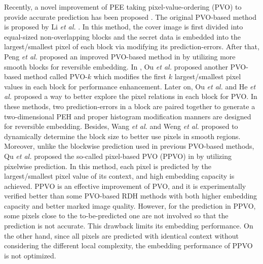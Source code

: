 \documentclass[review,3p,10pt,sort&compress]{elsarticle}
\begin{document}
Recently, a novel improvement of PEE taking pixel-value-ordering (PVO) to provide accurate prediction has been proposed \cite{
Li2013PVO,
Peng2014IPVO,
Ou2014PVOk,
Qu2015PPVO,
Xiang2015A,
Bo2016Improved,
Weng2016Reversible,
Weng2017Optimal,
He2018Reversible,
Kim2018Skewed}.
The original PVO-based method is proposed by Li \emph{et al.} \cite{Li2013PVO}. In this method, the cover image is first divided into equal-sized non-overlapping blocks and the secret data is embedded into the largest/smallest pixel of each block via modifying its prediction-errors.
After that, Peng \emph{et al.} proposed an improved PVO-based method in \cite{Peng2014IPVO} by utilizing more smooth blocks for reversible embedding. In \cite{Ou2014PVOk}, Ou \emph{et al.} proposed another PVO-based method called PVO-$k$ which modifies the first $k$ largest/smallest pixel values in each block for performance enhancement.
Later on, Ou \emph{et al.} \cite{Bo2016Improved} and He \emph{et al.} \cite{He2018Reversible} proposed a way to better explore the pixel relations in each block for PVO. In these methods, two prediction-errors in a block are paired together to generate a two-dimensional PEH and proper histogram modification manners are designed for reversible embedding.
Besides, Wang \emph{et al.} \cite{Xiang2015A} and Weng \emph{et al.} \cite{Weng2016Reversible} proposed to dynamically determine the block size to better use pixels in smooth regions.
Moreover, unlike the blockwise prediction used in previous PVO-based methods, Qu \emph{et al.} proposed the so-called pixel-based PVO (PPVO) in \cite{Qu2015PPVO} by utilizing pixelwise prediction. In this method, each pixel is predicted by the largest/smallest pixel value of its context, and high embedding capacity is achieved. PPVO is an effective improvement of PVO, and it is experimentally verified better than some PVO-based RDH methods with both higher embedding capacity and better marked image quality.
However, for the prediction in PPVO, some pixels close to the to-be-predicted one are not involved so that the prediction is not accurate. This drawback limits its embedding performance. On the other hand, since all pixels are predicted with identical context without considering the different local complexity, the embedding performance of PPVO is not optimized.
\end{document}
